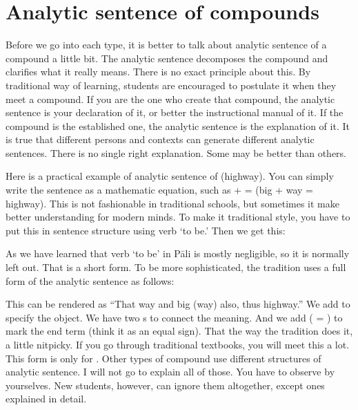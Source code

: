 \section*{Analytic sentence of compounds}

Before we go into each type, it is better to talk about analytic sentence of a compound a little bit. The analytic sentence decomposes the compound and clarifies what it really means. There is no exact principle about this. By traditional way of learning, students are encouraged to postulate it when they meet a compound. If you are the one who create that compound, the analytic sentence is your declaration of it, or better the instructional manual of it. If the compound is the established one, the analytic sentence is the explanation of it. It is true that different persons and contexts can generate different analytic sentences. There is no single right explanation. Some may be better than others. 

Here is a practical example of analytic sentence of  (highway). You can simply write the sentence as a mathematic equation, such as  +  =  (big + way = highway). This is not fashionable in traditional schools, but sometimes it make better understanding for modern minds. To make it traditional style, you have to put this in sentence structure using verb `to be.' Then we get this:


As we have learned that verb `to be' in P\=ali is mostly negligible, so it is normally left out. That is a short form. To be more sophisticated, the tradition uses a full form of the analytic sentence as follows:


This can be rendered as ``That way and big (way) also, thus highway.'' We add  to specify the object. We have two s to connect the meaning. And we add  ( = ) to mark the end term (think it as an equal sign). That the way the tradition does it, a little nitpicky. If you go through traditional textbooks, you will meet this a lot. This form is only for . Other types of compound use different structures of analytic sentence. I will not go to explain all of those. You have to observe by yourselves. New students, however, can ignore them altogether, except ones explained in detail.

